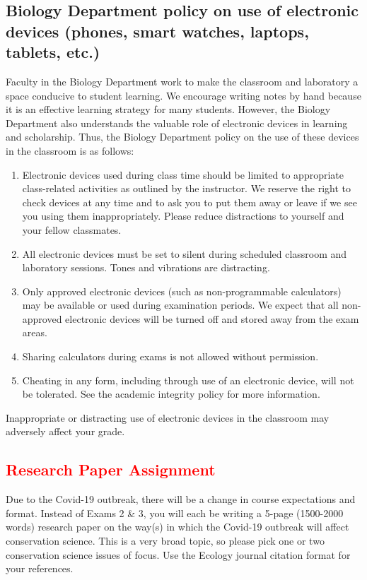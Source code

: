 \documentclass{tufte-handout}
\begin{document}
\begin{fullwidth}
\subsection{Biology Department policy on use of electronic devices (phones, smart watches, laptops, tablets, etc.)}

Faculty in the Biology Department work to make the classroom and laboratory a space conducive to student learning. We encourage writing notes by hand because it is an effective learning strategy for many students. However, the Biology Department also understands the valuable role of electronic devices in learning and scholarship. Thus, the Biology Department policy on the use of these devices in the classroom is as follows:


\begin{enumerate}
\item Electronic devices used during class time should be limited to appropriate class-related activities as outlined by the instructor. We reserve the right to check devices at any time and to ask you to put them away or leave if we see you using them inappropriately. Please reduce distractions to yourself and your fellow classmates.
\item All electronic devices must be set to silent during scheduled classroom and laboratory sessions. Tones and vibrations are distracting.
\item Only approved electronic devices (such as non-programmable calculators) may be available or used during examination periods. We expect that all non-approved electronic devices will be turned off and stored away from the exam areas.
\item Sharing calculators during exams is not allowed without permission. 
\item Cheating in any form, including through use of an electronic device, will not be tolerated. See the academic integrity policy for more information.
\end{enumerate}

Inappropriate or distracting use of electronic devices in the classroom may adversely affect your  grade. 


\subsection{\textcolor{red}{Research Paper Assignment}}

Due to the Covid-19 outbreak, there will be a change in course expectations and format. Instead of Exams 2 \& 3, you will each be writing a 5-page (1500-2000 words) research paper on the way(s) in which the Covid-19 outbreak will affect conservation science. This is a very broad topic, so please pick one or two conservation science issues of focus. Use the Ecology journal citation format for your references. 


\end{fullwidth}
\end{document}
